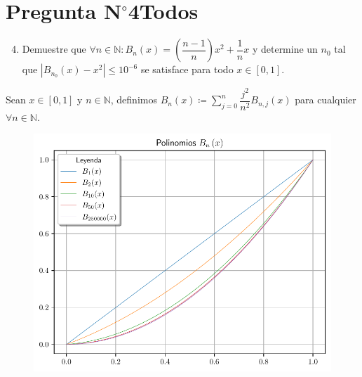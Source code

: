\section{Pregunta N$^{\circ}$4\qquad Todos}



\begin{frame}
	\begin{enumerate}\setcounter{enumi}{3}
		\item

		      Demuestre que
		      \begin{math}
			      \forall n\in\mathbb{N}:
			      B_{n}\left(x\right)=
			      \left(\dfrac{n-1}{n}\right)x^{2}+
			      \dfrac{1}{n}x
		      \end{math}
		      y determine un $n_{0}$ tal que
		      \begin{math}
			      \left|
			      B_{n_{0}}\left(x\right)-
			      x^{2}
			      \right|\leq
			      10^{-6}
		      \end{math}
		      se satisface para todo $x\in\left[0,1\right]$.
	\end{enumerate}

	\begin{solution}
		Sean $x\in\left[0,1\right]$ y $n\in\mathbb{N}$, definimos
		\begin{math}
			B_{n}\left(x\right)\coloneqq
			\sum\limits_{j=0}^{n}
			\dfrac{j^{2}}{n^{2}}
			B_{n,j}\left(x\right)
		\end{math}
		para cualquier
		\begin{math}
			\forall n\in\mathbb{N}
		\end{math}.

		\begin{figure}[ht!]
			\centering
			\includegraphics[width=.6\paperwidth]{p4}
		\end{figure}
	\end{solution}
\end{frame}

